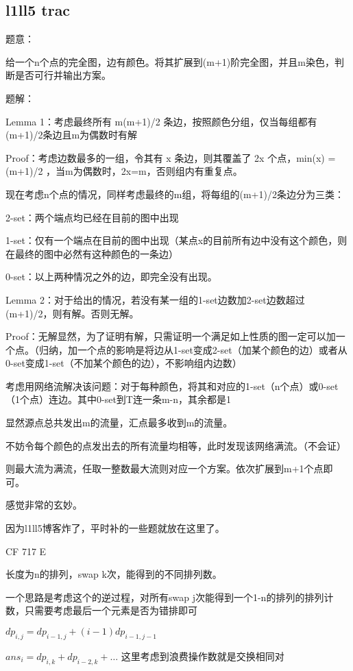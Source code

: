 \documentclass{ctexart}
\begin{document}
\subsection{l1ll5 trac}

题意：

给一个n个点的完全图，边有颜色。将其扩展到(m+1)阶完全图，并且m染色，判断是否可行并输出方案。

题解：

Lemma 1：考虑最终所有 m(m+1)/2 条边，按照颜色分组，仅当每组都有(m+1)/2条边且m为偶数时有解

Proof：考虑边数最多的一组，令其有 x 条边，则其覆盖了 2x 个点，min(x) = (m+1)/2 ，当m为偶数时，2x=m，否则组内有重复点。

现在考虑n个点的情况，同样考虑最终的m组，将每组的(m+1)/2条边分为三类：

2-set：两个端点均已经在目前的图中出现

1-set：仅有一个端点在目前的图中出现（某点x的目前所有边中没有这个颜色，则在最终的图中必然有这种颜色的一条边）

0-set：以上两种情况之外的边，即完全没有出现。

Lemma 2：对于给出的情况，若没有某一组的1-set边数加2-set边数超过(m+1)/2，则有解。否则无解。

Proof：无解显然，为了证明有解，只需证明一个满足如上性质的图一定可以加一个点。（归纳，加一个点的影响是将边从1-set变成2-set（加某个颜色的边）或者从0-set变成1-set（不加某个颜色的边），不影响组内边数）

考虑用网络流解决该问题：对于每种颜色，将其和对应的1-set（n个点）或0-set（1个点）连边。其中0-set到T连一条m-n，其余都是1

显然源点总共发出m的流量，汇点最多收到m的流量。

不妨令每个颜色的点发出去的所有流量均相等，此时发现该网络满流。（不会证）

则最大流为满流，任取一整数最大流则对应一个方案。依次扩展到m+1个点即可。

感觉非常的玄妙。

因为l1ll5博客炸了，平时补的一些题就放在这里了。

CF 717 E

长度为n的排列，swap k次，能得到的不同排列数。

一个思路是考虑这个的逆过程，对所有swap j次能得到一个1-n的排列的排列计数，只需要考虑最后一个元素是否为错排即可

$dp_{i,j}=dp_{i-1,j}+(i-1)dp_{i-1,j-1}$

$ans_i = dp_{i,k}+dp_{i-2,k} + \ldots$ 这里考虑到浪费操作数就是交换相同对
\end{document}
